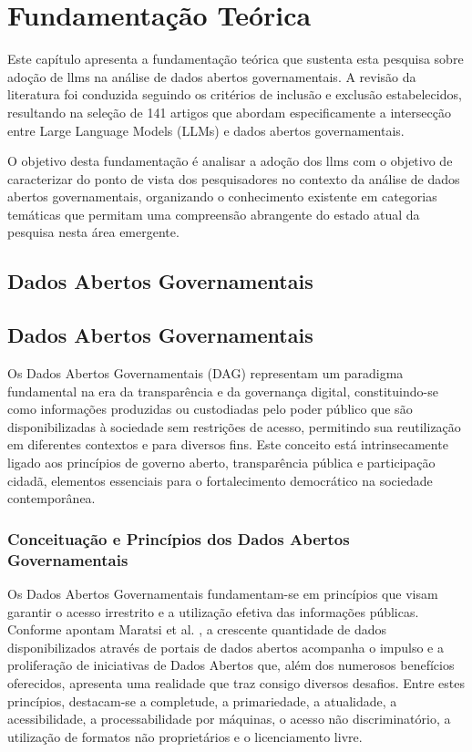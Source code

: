 
\chapter{Fundamentação Teórica}

Este capítulo apresenta a fundamentação teórica que sustenta esta pesquisa sobre adoção de llms na análise de dados abertos governamentais. 
A revisão da literatura foi conduzida seguindo os critérios de inclusão e exclusão estabelecidos, 
resultando na seleção de 141 artigos que abordam especificamente a intersecção entre 
Large Language Models (LLMs) e dados abertos governamentais.

O objetivo desta fundamentação é analisar a adoção dos llms com o objetivo de caracterizar do ponto de vista dos pesquisadores no contexto da análise de dados abertos governamentais, 
organizando o conhecimento existente em categorias temáticas que permitam uma compreensão 
abrangente do estado atual da pesquisa nesta área emergente.


\section{Dados Abertos Governamentais}
\section{Dados Abertos Governamentais}

Os Dados Abertos Governamentais (DAG) representam um paradigma fundamental na era da transparência e da governança digital, constituindo-se como informações produzidas ou custodiadas pelo poder público que são disponibilizadas à sociedade sem restrições de acesso, permitindo sua reutilização em diferentes contextos e para diversos fins. Este conceito está intrinsecamente ligado aos princípios de governo aberto, transparência pública e participação cidadã, elementos essenciais para o fortalecimento democrático na sociedade contemporânea.

\subsection{Conceituação e Princípios dos Dados Abertos Governamentais}

Os Dados Abertos Governamentais fundamentam-se em princípios que visam garantir o acesso irrestrito e a utilização efetiva das informações públicas. Conforme apontam Maratsi et al. \cite{ref_6}, a crescente quantidade de dados disponibilizados através de portais de dados abertos acompanha o impulso e a proliferação de iniciativas de Dados Abertos que, além dos numerosos benefícios oferecidos, apresenta uma realidade que traz consigo diversos desafios. Entre estes princípios, destacam-se a completude, a primariedade, a atualidade, a acessibilidade, a processabilidade por máquinas, o acesso não discriminatório, a utilização de formatos não proprietários e o licenciamento livre.

